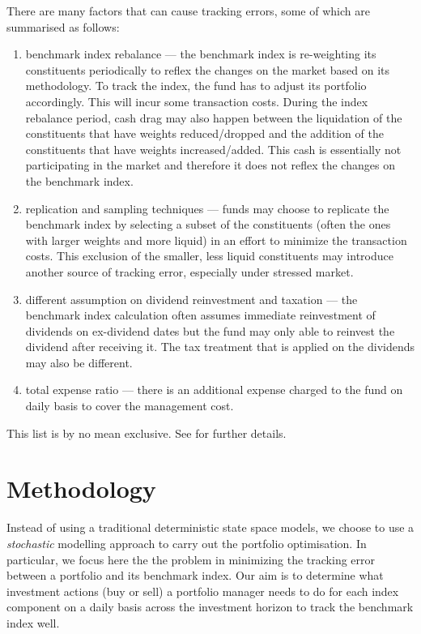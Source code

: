 There are many factors that can cause tracking errors, some of which are summarised as follows:
\begin{enumerate}
\item benchmark index rebalance --- the benchmark index is re-weighting its constituents periodically to reflex the changes on the market based on its methodology. To track the index, the fund has to adjust its portfolio accordingly. This will incur some transaction costs. During the index rebalance period, cash drag may also  happen between the liquidation of the constituents that have weights reduced/dropped and the addition of the constituents that have weights increased/added. This cash is essentially not participating in the market and therefore it does not reflex the changes on the benchmark index.
\item replication and sampling techniques --- funds may choose to replicate the benchmark index by selecting a subset of the constituents (often the ones with larger weights and more liquid) in an effort to minimize the transaction costs. This exclusion of the smaller, less liquid constituents may introduce another source of tracking error, especially under stressed market.
\item different assumption on dividend reinvestment and taxation --- the benchmark index calculation often assumes immediate reinvestment of dividends on ex-dividend dates but the fund may only able to reinvest the dividend after receiving it. The tax treatment that is applied on the dividends may also be different.
\item total expense ratio --- there is an additional expense charged to the fund on daily basis to cover the management cost.
\end{enumerate}
This list is by no mean exclusive. See \cite{BJ13} for further details.
 
\section{Methodology}
Instead of using a traditional deterministic state space models, we choose to use a \emph{stochastic} modelling approach to carry out the portfolio optimisation. In particular, we focus here the the problem in minimizing the tracking error between a portfolio and its benchmark index.  Our aim is to determine what investment actions (buy or sell) a portfolio manager needs to do for each index component on a daily basis across the investment horizon to track the benchmark index well.

